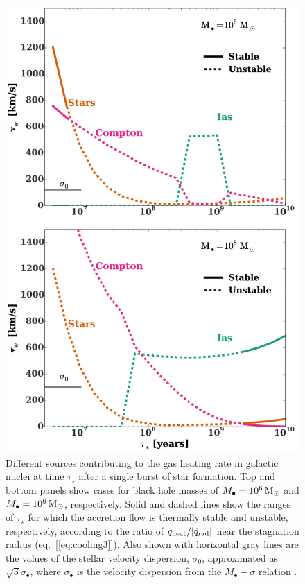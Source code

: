 \documentclass[usenatbib,fleqn]{mn2e}
\newcommand{\Mbh}[1][]{M_{\bullet#1}}
\begin{document}
\begin{figure}
\includegraphics[width=\columnwidth]{vwSourcesImp.pdf}
\caption{\label{fig:vwSourcesImp} Different sources contributing to
  the gas heating rate in galactic nuclei at time $\tau_{\star}$ after
  a single burst of star formation.  Top and bottom panels show cases
  for black hole masses of $\Mbh=10^6 \Msun$ and $\Mbh= 10^8 \Msun$,
  respectively.  Solid and dashed lines show the ranges of
  $\tau_{\star}$ for which the accretion flow is thermally stable and
  unstable, respectively, according to the ratio of $\dot{q}_{\rm
    heat}/|\dot{q}_{\rm rad}|$ near the stagnation radius
  (eq.~[\ref{eq:cooling3}]).  Also shown with horizontal gray lines
  are the values of the stellar velocity dispersion, $\sigma_0$,
  approximated as $\sqrt{3} \sigma_{\bullet}$, where
  $\sigma_{\bullet}$ is the velocity dispersion from the $\Mbh-\sigma$
  relation \citep{McConnellMa+:2011a}.}
\end{figure}
\end{document}
